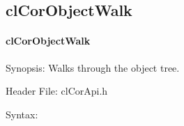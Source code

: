 \begin{flushleft}
\subsection{clCorObjectWalk}
\hypertarget{pagecor107}{}\paragraph{cl\-Cor\-Object\-Walk}\label{pagecor107}
\begin{Desc}
\item[Synopsis:]Walks through the object tree.\end{Desc}
\begin{Desc}
\item[Header File:]clCorApi.h\end{Desc}
\begin{Desc}
\item[Syntax:]


\end{Desc}
\end{flushleft}
